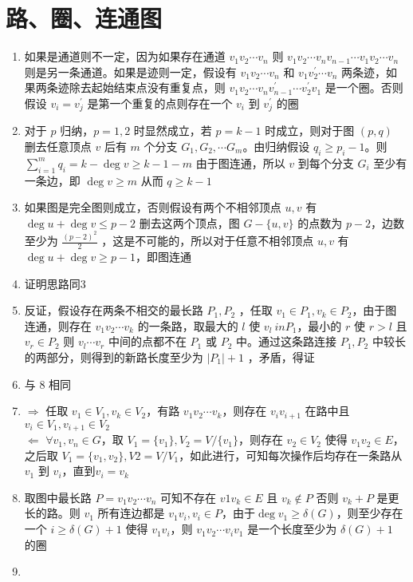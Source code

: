 \documentclass[../../main.tex]{subfiles}
\begin{document}
\section{路、圈、连通图}
\begin{enumerate}
    \item 如果是通道则不一定，因为如果存在通道 $v_1v_2\cdots v_n$ 则 $v_1v_2\cdots v_nv_{n-1}\cdots v_1v_2\cdots v_n$ 则是另一条通道。如果是迹则一定，假设有 $v_1v_2\cdots v_n$ 和 $v_1v^{'}_{2}\cdots v_n$ 两条迹，如果两条迹除去起始结束点没有重复点，则 $v_1v_2\cdots v_nv^{'}_{n-1}\cdots v^{'}_{2}v_1$ 是一个圈。否则假设 $v_i=v^{'}_{j}$ 是第一个重复的点则存在一个 $v_i$ 到 $v^{'}_{j}$ 的圈
    \item 对于 $p$ 归纳，$p=1,2$ 时显然成立，若 $p=k-1$ 时成立，则对于图 $(p,q)$ 删去任意顶点 $v$ 后有 $m$ 个分支 $G_1,G_2,\cdots G_m$。由归纳假设 $q_i \ge p_i-1$。则 $\sum\limits_{i=1}^{m}q_i=k-\deg v \ge k-1-m$ 由于图连通，所以 $v$ 到每个分支 $G_i$ 至少有一条边，即 $\deg v \ge m$ 从而 $q \ge k-1$
    \item 如果图是完全图则成立，否则假设有两个不相邻顶点 $u,v$ 有 $\deg u + \deg v \le p-2$ 删去这两个顶点，图 $G-\{u,v\}$ 的点数为 $p-2$，边数至少为 $\frac{(p-2)^2}{2}$ ，这是不可能的，所以对于任意不相邻顶点 $u,v$ 有 $\deg u + \deg v \ge p-1$，即图连通
    \item 证明思路同3
    \item 反证，假设存在两条不相交的最长路 $P_1,P_2$ ，任取 $v_1 \in P_1,v_k \in P_2$，由于图连通，则存在 $v_1v_2\cdots v_k$ 的一条路，取最大的 $l$ 使 $v_l \ in P_1$，最小的 $r$ 使 $r > l$ 且 $v_r \in P_2$ 则 $v_l \cdots v_r$ 中间的点都不在 $P_1$ 或 $P_2$ 中。通过这条路连接 $P_1,P_2$ 中较长的两部分，则得到的新路长度至少为 $|P_1|+1$ ，矛盾，得证
    \item 与 8 相同
    \item $\Rightarrow$ 任取 $v_1 \in V_1,v_k \in V_2$，有路 $v_1v_2\cdots v_k$，则存在 $v_{i}v_{i+1}$ 在路中且 $v_i \in V_1,v_{i+1} \in V_2$\\ $\Leftarrow$ $\forall v_1,v_n \in G$，取 $V_1=\{v_1\},V_2=V/\{v_1\}$，则存在 $v_2 \in V_2$ 使得 $v_1v_2 \in E$，之后取 $V_{1} = \{v_1,v_2\},V2=V/V_{1}$，如此进行，可知每次操作后均存在一条路从 $v_1$ 到 $v_i$，直到$v_i=v_k$
    \item 取图中最长路 $P=v_1v_2\cdots v_n$ 可知不存在 $v1v_k \in E$ 且 $v_k \notin P$ 否则 $v_k+P$ 是更长的路。则 $v_1$ 所有连边都是 $v_1v_i,v_i \in P$，由于$\deg v_1 \ge \delta(G)$，则至少存在一个 $i \ge \delta(G) + 1$ 使得 $v_1v_i$，则 $v_1v_2\cdots v_iv_1$ 是一个长度至少为 $\delta(G) + 1$ 的圈
    \item \begin{enumerate}

\end{enumerate}
\end{enumerate}
\end{document}
